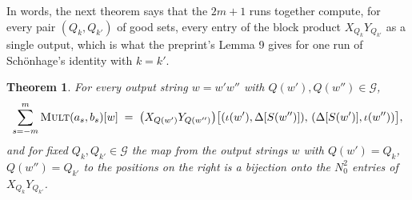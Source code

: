 \documentclass[11pt]{article}
\newtheorem{theorem}{Theorem}[section]
\theoremstyle{definition}
\theoremstyle{remark}
\newcommand{\Mult}{\textnormal{\textsc{Mult}}}
\newcommand{\Nz}{N_0}
\newcommand{\Qg}{\mathcal{G}}
\begin{document}
In words, the next theorem says that the $2m+1$ runs together compute, for every pair $(Q_k,Q_{k'})$ of good sets, every entry of the block product $X_{Q_k}Y_{Q_{k'}}$ as a single output, which is what the preprint's Lemma 9 gives for one run of Schönhage's identity with $k=k'$.

\begin{theorem}\label{m:thm:correct}
For every output string $w=w'w''$ with $Q(w'),Q(w'')\in\Qg$,
\[
\sum_{s=-m}^{m}\Mult(a_s,b_s)[w]\;=\;\big(X_{Q(w')}Y_{Q(w'')}\big)\big[(\iota(w'),\Delta[S(w'')]),\,(\Delta[S(w')],\iota(w''))\big],
\]
and for fixed $Q_k,Q_{k'}\in\Qg$ the map from the output strings $w$ with $Q(w')=Q_k$, $Q(w'')=Q_{k'}$ to the positions on the right is a bijection onto the $\Nz^2$ entries of $X_{Q_k}Y_{Q_{k'}}$.
\end{theorem}
\end{document}
